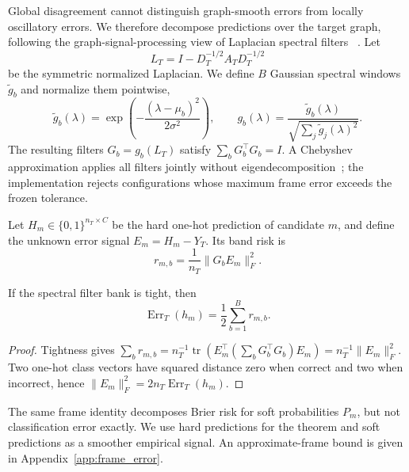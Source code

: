 Global disagreement cannot distinguish graph-smooth errors from locally
oscillatory errors. We therefore decompose predictions over the target graph,
following the graph-signal-processing view of Laplacian spectral filters
~\citep{shuman2013emerging,hammond2011wavelets}.
Let
\begin{equation}
  L_T=I-D_T^{-1/2}A_TD_T^{-1/2}
\end{equation}
be the symmetric normalized Laplacian. We define $B$ Gaussian spectral windows
$\widetilde g_b$ and normalize them pointwise,
\begin{equation}
  \widetilde g_b(\lambda)
  =\exp\!\left(-\frac{(\lambda-\mu_b)^2}{2\sigma^2}\right),
  \qquad
  g_b(\lambda)
  =\frac{\widetilde g_b(\lambda)}
  {\sqrt{\sum_j\widetilde g_j(\lambda)^2}}.
  \label{eq:tight_windows}
\end{equation}
The resulting filters $G_b=g_b(L_T)$ satisfy
$\sum_bG_b^\top G_b=I$. A Chebyshev approximation applies all filters jointly
without eigendecomposition~\citep{defferrard2016convolutional}; the implementation rejects configurations whose
maximum frame error exceeds the frozen tolerance.

Let $H_m\in\{0,1\}^{n_T\times C}$ be the hard one-hot prediction of candidate
$m$, and define the unknown error signal $E_m=H_m-Y_T$. Its band risk is
\begin{equation}
  r_{m,b}=\frac{1}{n_T}\lVert G_bE_m\rVert_F^2.
  \label{eq:band_risk}
\end{equation}

\begin{lemma}
If the spectral filter bank is tight, then
\begin{equation}
  \operatorname{Err}_T(h_m)=\frac{1}{2}\sum_{b=1}^{B}r_{m,b}.
  \label{eq:exact_decomposition}
\end{equation}
\end{lemma}
\begin{proof}
Tightness gives
$\sum_b r_{m,b}=n_T^{-1}\operatorname{tr}
(E_m^\top(\sum_bG_b^\top G_b)E_m)
=n_T^{-1}\lVert E_m\rVert_F^2$.
Two one-hot class vectors have squared distance zero when correct and two when
incorrect, hence $\lVert E_m\rVert_F^2=2n_T\operatorname{Err}_T(h_m)$.
\end{proof}

The same frame identity decomposes Brier risk for soft probabilities $P_m$,
but not classification error exactly. We use hard predictions for the theorem
and soft predictions as a smoother empirical signal. An approximate-frame
bound is given in Appendix~\ref{app:frame_error}.

